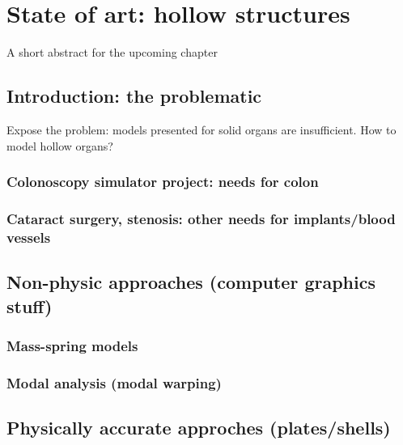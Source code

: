 \chapter{State of art: hollow structures}
\label{chap7}
\begin{shortAbstract}
A short abstract for the upcoming chapter
\end{shortAbstract}


\section{Introduction: the problematic}
Expose the problem: models presented for solid organs are insufficient. How to model hollow organs?

	\subsection{Colonoscopy simulator project: needs for colon}

	\subsection{Cataract surgery, stenosis: other needs for implants/blood vessels}
		
\section{Non-physic approaches (computer graphics stuff)}
	
	\subsection{Mass-spring models}
	
	\subsection{Modal analysis (modal warping)}
		
\section{Physically accurate approches (plates/shells)}

